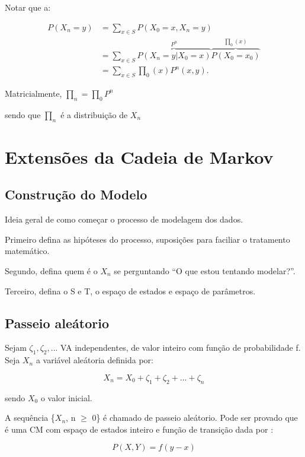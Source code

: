 \documentclass[]{article}
\theoremstyle{definition}
\theoremstyle{definition}
\theoremstyle{definition}
\theoremstyle{remark}
\begin{document}
Notar que a:

\begin{equation}
\begin{split}
P(X_n=y) &= \sum_{x \in S} P(X_0=x,X_n=y)\\
&= \sum_{x \in S} \overbrace{P(X_n=y|X_0=x)}^{P^n}
\overbrace{P(X_0=x_0)}^{\prod_0(x)}\\
&= \sum_{x \in S} \prod_0(x) P^n(x,y).
\end{split}
\end{equation}

Matricialmente, \(\prod_n=\prod_0P^n\)

sendo que \(\prod_n\) é a distribuição de \(X_n\)

\section{Extensões da Cadeia de
Markov}\label{extensoes-da-cadeia-de-markov}

\subsection{Construção do Modelo}\label{construcao-do-modelo}

Ideia geral de como começar o processo de modelagem dos dados.

Primeiro defina as hipóteses do processo, suposições para faciliar o
tratamento matemático.

Segundo, defina quem é o \(X_n\) se perguntando ``O que estou tentando
modelar?''.

Terceiro, defina o S e T, o espaço de estados e espaço de parâmetros.

\subsection{Passeio aleátorio}\label{passeio-aleatorio}

Sejam \(\zeta_1, \zeta_2, ...\) VA independentes, de valor inteiro com
função de probabilidade f. Seja \(X_n\) a variável aleátoria definida
por:

\[X_n = X_0 + \zeta_1 + \zeta_2 + ... + \zeta_n\]

sendo \(X_0\) o valor inicial.

A sequência \{\(X_n\), n \(\geq\) 0\} é chamado de passeio aleátorio.
Pode ser provado que é uma CM com espaço de estados inteiro e função de
transição dada por :

\[P(X,Y) = f(y-x)\]
\end{document}
